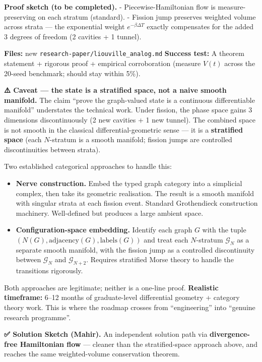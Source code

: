 \documentclass[
  11pt,
  a4paper,
]{article}
\providecommand{\tightlist}{%
  \setlength{\itemsep}{0pt}\setlength{\parskip}{0pt}}
\begin{document}
\textbf{Proof sketch (to be completed).} - Piecewise-Hamiltonian flow is
measure-preserving on each stratum (standard). - Fission jump preserves
weighted volume across strata --- the exponential weight
\(e^{-\beta \Delta T}\) exactly compensates for the added 3 degrees of
freedom (2 cavities + 1 tunnel).

\textbf{Files:} new \texttt{research-paper/liouville\_analog.md}
\textbf{Success test:} A theorem statement + rigorous proof + empirical
corroboration (measure \(V(t)\) across the 20-seed benchmark; should
stay within 5\%).

\textbf{⚠️ Caveat --- the state is a stratified space, not a naive
smooth manifold.} The claim ``prove the graph-valued state is a
continuous differentiable manifold'' understates the technical work.
Under fission, the phase space gains 3 dimensions discontinuously (2 new
cavities + 1 new tunnel). The combined space is not smooth in the
classical differential-geometric sense --- it is a \textbf{stratified
space} (each \(N\)-stratum is a smooth manifold; fission jumps are
controlled discontinuities between strata).

Two established categorical approaches to handle this:

\begin{itemize}
\tightlist
\item
  \textbf{Nerve construction.} Embed the typed graph category into a
  simplicial complex, then take its geometric realisation. The result is
  a smooth manifold with singular strata at each fission event. Standard
  Grothendieck construction machinery. Well-defined but produces a large
  ambient space.
\item
  \textbf{Configuration-space embedding.} Identify each graph \(G\) with
  the tuple \((N(G), \text{adjacency}(G), \text{labels}(G))\) and treat
  each \(N\)-stratum \(\mathcal{G}_N\) as a separate smooth manifold,
  with the fission jump as a controlled discontinuity between
  \(\mathcal{G}_N\) and \(\mathcal{G}_{N+2}\). Requires stratified Morse
  theory to handle the transitions rigorously.
\end{itemize}

Both approaches are legitimate; neither is a one-line proof.
\textbf{Realistic timeframe:} 6--12 months of graduate-level
differential geometry + category theory work. This is where the roadmap
crosses from ``engineering'' into ``genuine research programme''.

\textbf{✅ Solution Sketch (Mahir).} An independent solution path via
\textbf{divergence-free Hamiltonian flow} --- cleaner than the
stratified-space approach above, and reaches the same weighted-volume
conservation theorem.
\end{document}

